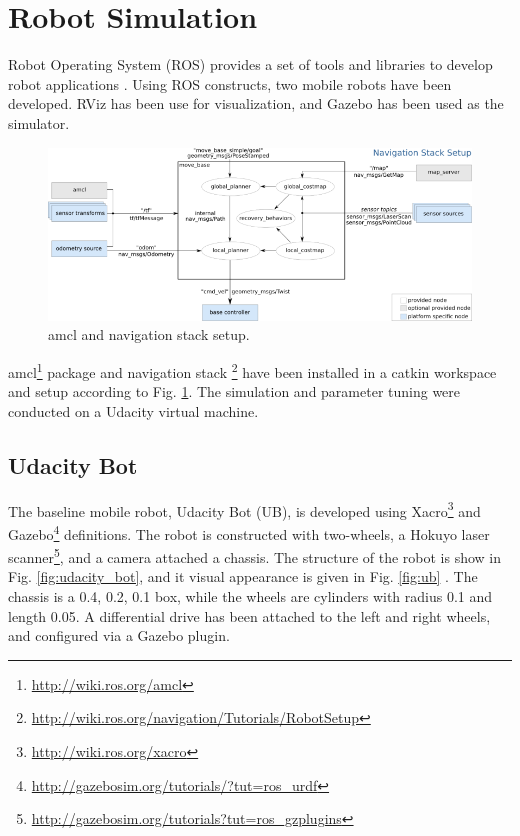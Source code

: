 \documentclass[10pt,journal,compsoc]{IEEEtran}
\begin{document}
\section{Robot Simulation}

Robot Operating System (ROS) provides a set of tools and libraries to develop robot applications \cite{288}. Using ROS constructs, two mobile robots have been developed.  RViz has been use for visualization, and Gazebo has been used as the simulator. 

\begin{figure}[thpb]
      \centering
      \includegraphics[width=\linewidth]{misc/overview_tf_small.png}
      \caption{amcl and navigation stack setup.}
      \label{fig:nav_stack}
\end{figure}

amcl\footnote{\url{http://wiki.ros.org/amcl}} package and navigation stack \footnote{\url{http://wiki.ros.org/navigation/Tutorials/RobotSetup}} have been installed in a catkin workspace and setup according to Fig. \ref{fig:nav_stack}. The simulation and parameter tuning were conducted on a Udacity virtual machine.

\subsection{Udacity Bot}
\label{subsec:udacity_bot}

The baseline mobile robot, Udacity Bot (UB), is developed using Xacro\footnote{\url{http://wiki.ros.org/xacro}} and Gazebo\footnote{\url{http://gazebosim.org/tutorials/?tut=ros_urdf}} definitions. The robot is constructed  with two-wheels, a Hokuyo laser scanner\footnote{\url{http://gazebosim.org/tutorials?tut=ros_gzplugins}}, and a camera attached a chassis. The structure of the robot is show in Fig. \ref{fig:udacity_bot}, and it visual appearance is given in Fig. \ref{fig:ub}  . The chassis is a 0.4, 0.2, 0.1 box, while the wheels are cylinders with radius 0.1 and length 0.05.  A differential drive has been attached to the left and right wheels, and configured via a Gazebo plugin. 
\end{document}
